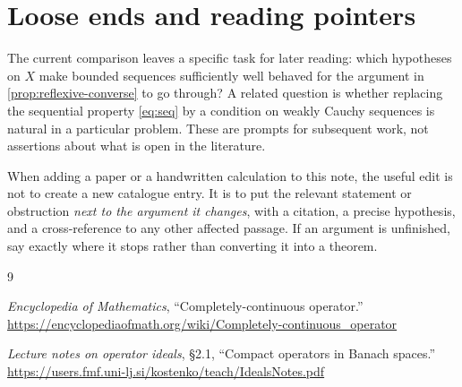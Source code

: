 \documentclass[11pt,a4paper]{article}
\theoremstyle{definition}
\theoremstyle{remark}
\begin{document}
\section{Loose ends and reading pointers}\label{sec:threads}

The current comparison leaves a specific task for later reading: which
hypotheses on $X$ make bounded sequences sufficiently well behaved for
the argument in \cref{prop:reflexive-converse} to go through?  A related
question is whether replacing the sequential property \eqref{eq:seq}
by a condition on weakly Cauchy sequences is natural in a particular
problem.  These are prompts for subsequent work, not assertions about
what is open in the literature.

When adding a paper or a handwritten calculation to this note, the
useful edit is not to create a new catalogue entry.  It is to put the
relevant statement or obstruction \emph{next to the argument it changes},
with a citation, a precise hypothesis, and a cross-reference to any
other affected passage.  If an argument is unfinished, say exactly where
it stops rather than converting it into a theorem.

\begin{thebibliography}{9}

\emph{Encyclopedia of Mathematics},
``Completely-continuous operator.''
\url{https://encyclopediaofmath.org/wiki/Completely-continuous_operator}

\emph{Lecture notes on operator ideals}, \S2.1, ``Compact operators in
Banach spaces.''
\url{https://users.fmf.uni-lj.si/kostenko/teach/IdealsNotes.pdf}

\end{thebibliography}
\end{document}
